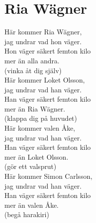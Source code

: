 \section{Ria Wägner}
Här kommer Ria Wägner,\\
jag undrar vad hon väger.\\
Hon väger säkert femton kilo\\
mer än alla andra.\\
(vinka åt dig själv)\\

Här kommer Loket Olsson,\\
jag undrar vad han väger.\\
Han väger säkert femton kilo\\
mer än Ria Wägner.\\
(klappa dig på huvudet)\\

Här kommer valen Åke,\\
jag undrar vad han väger.\\
Han väger säkert femton kilo\\
mer än Loket Olsson.\\
(gör ett valsprut)\\

Här kommer Simon Carlsson,\\
jag undrar vad han väger.\\
Han väger säkert femton kilo\\
mer än valen Åke.\\
(begå harakiri)\\